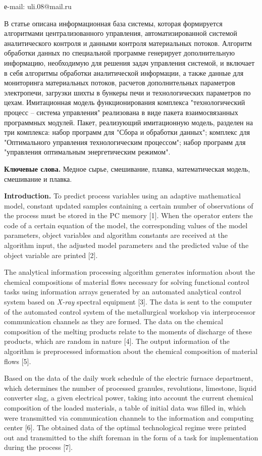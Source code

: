 е-mail: uli.08@mail.ru

В статье описана информационная база системы, которая формируется
алгоритмами централизованного управления, автоматизированной системой
аналитического контроля и данными контроля материальных потоков.
Алгоритм обработки данных по специальной программе генерирует
дополнительную информацию, необходимую для решения задач управления
системой, и включает в себя алгоритмы обработки аналитической
информации, а также данные для мониторинга материальных потоков,
расчетов дополнительных параметров электропечи, загрузки шихты в бункеры
печи и технологических параметров по цехам. Имитационная модель
функционирования комплекса "технологический процесс -- система
управления" реализована в виде пакета взаимосвязанных программных
модулей. Пакет, реализующий имитационную модель, разделен на три
комплекса: набор программ для "Сбора и обработки данных"; комплекс для
"Оптимального управления технологическим процессом"; набор программ для
"управления оптимальным энергетическим режимом".

\textbf{Ключевые слова.} Медное сырье, смешивание, плавка,
математическая модель, смешивание и плавка.

\textbf{Introduction.} To predict process variables using an adaptive
mathematical model, constant updated samples containing a certain number
of observations of the process must be stored in the PC memory {[}1{]}.
When the operator enters the code of a certain equation of the model,
the corresponding values of the model parameters, object variables and
algorithm constants are received at the algorithm input, the adjusted
model parameters and the predicted value of the object variable are
printed {[}2{]}.

The analytical information processing algorithm generates information
about the chemical compositions of material flows necessary for solving
functional control tasks using information arrays generated by an
automated analytical control system based on \emph{X-ray} spectral
equipment {[}3{]}. The data is sent to the computer of the automated
control system of the metallurgical workshop via interprocessor
communication channels as they are formed. The data on the chemical
composition of the melting products relate to the moments of discharge
of these products, which are random in nature {[}4{]}. The output
information of the algorithm is preprocessed information about the
chemical composition of material flows {[}5{]}.

Based on the data of the daily work schedule of the electric furnace
department, which determines the number of processed granules,
revolutions, limestone, liquid converter slag, a given electrical power,
taking into account the current chemical composition of the loaded
materials, a table of initial data was filled in, which were transmitted
via communication channels to the information and computing center
{[}6{]}. The obtained data of the optimal technological regime were
printed out and transmitted to the shift foreman in the form of a task
for implementation during the process {[}7{]}.

